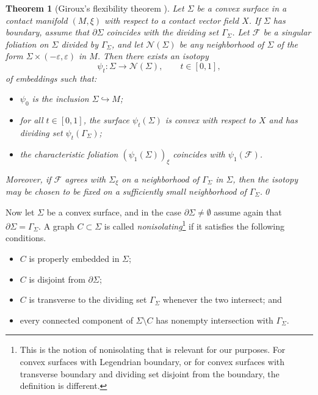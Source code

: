 \documentclass{amsart}
\numberwithin{equation}{section}
\numberwithin{figure}{section}
\newtheorem{theorem}{Theorem}[section]
\theoremstyle{definition}
\theoremstyle{remark}
\let\oldSigma\Sigma
\renewcommand{\Sigma}{\oldSigma}
\let\olddxi\xi %
\renewcommand{\xi}{\olddxi}
\newcommand{\X}{X}
\let\oldgamma\Gamma %
\renewcommand{\Gamma}{\oldgamma}
\begin{document}
\begin{theorem}[Giroux's flexibility theorem \cite{Giroux91,Etnyre_VHM11}]\label{thm:Giroux_flexibility}
Let $\Sigma$ be a convex surface in a contact manifold $(M,\xi)$ with respect to a contact vector field $\X$. If $\Sigma$ has boundary, assume that $\partial\Sigma$ coincides with the dividing set $\Gamma_\Sigma$. Let $\mathcal{F}$ be a singular foliation on $\Sigma$ divided by $\Gamma_\Sigma$, and let $\mathcal{N}(\Sigma)$ be any neighborhood of $\Sigma$ of the form $\Sigma\times(-\varepsilon,\varepsilon)$ in $M$. Then there exists an isotopy
\[
\psi_t\colon \Sigma \longrightarrow \mathcal{N}(\Sigma), \qquad t\in[0,1],
\]
of embeddings such that:
\begin{itemize}
    \item $\psi_0$ is the inclusion $\Sigma\hookrightarrow M$;
    \item for all $t\in[0,1]$, the surface $\psi_t(\Sigma)$ is convex with respect to $\X$ and has dividing set $\psi_t(\Gamma_\Sigma)$;
    \item the characteristic foliation $(\psi_1(\Sigma))_\xi$ coincides with $\psi_1(\mathcal{F})$.
\end{itemize}
Moreover, if $\mathcal{F}$ agrees with $\Sigma_\xi$ on a neighborhood of $\Gamma_\Sigma$ in $\Sigma$, then the isotopy may be chosen to be fixed on a sufficiently small neighborhood of $\Gamma_\Sigma$.\qed
\end{theorem}

Now let $\Sigma$ be a convex surface, and in the case $\partial\Sigma\neq\emptyset$ assume again that $\partial\Sigma=\Gamma_\Sigma$. A graph $C\subset\Sigma$ is called \emph{nonisolating}\footnote{This is the notion of nonisolating that is relevant for our purposes. For convex surfaces with Legendrian boundary, or for convex surfaces with transverse boundary and dividing set disjoint from the boundary, the definition is different.} if it satisfies the following conditions.
\begin{itemize}
    \item $C$ is properly embedded in $\Sigma$;
    \item $C$ is disjoint from $\partial\Sigma$;
    \item $C$ is transverse to the dividing set $\Gamma_\Sigma$ whenever the two intersect; and
    \item every connected component of $\Sigma\setminus C$ has nonempty intersection with $\Gamma_\Sigma$.
\end{itemize}
\end{document}
